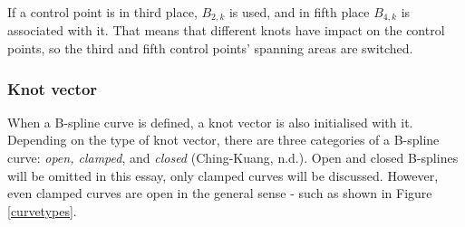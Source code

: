 \documentclass{article}
\begin{document}
If a control point is in third place, $B_{2,k}$ is used, and in fifth place $B_{4,k}$ is associated with it. That means that different knots have impact on the control points, so the third and fifth control points' spanning areas are switched.

\subsubsection{Knot vector}

\vspace{6pt}

When a B-spline curve is defined, a knot vector is also initialised with it. Depending on the type of knot vector, there are three categories of a B-spline curve: \emph{open, clamped}, and \emph{closed} (Ching-Kuang, n.d.). Open and closed B-splines will be omitted in this essay, only clamped curves will be discussed. However, even clamped curves are open in the general sense - such as shown in Figure \ref{curvetypes}.
\end{document}
